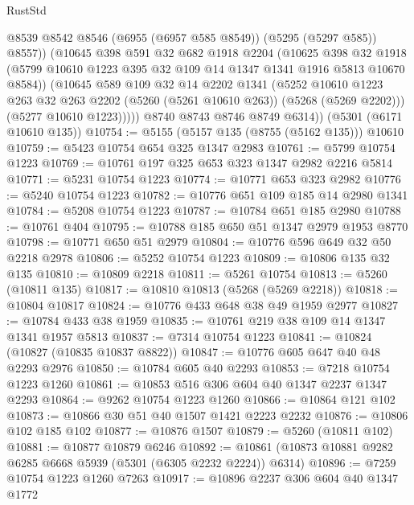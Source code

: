 \begin{lexlean}{RustStd}
\begin{coremodule}
                @8539
                @8542
                @8546
                (@6955 (@6957 @585 @8549))
                (@5295 (@5297 @585))
                @8557))
            (@10645
              @398
              @591
              @32
              @682
              @1918
              @2204
              (@10625
                @398
                @32
                @1918
                (@5799 @10610 @1223 @395 @32 @109 @14 @1347 @1341 @1916 @5813 @10670 @8584))
              (@10645
                @589
                @109
                @32
                @14
                @2202
                @1341
                (@5252
                  @10610
                  @1223
                  @263
                  @32
                  @263
                  @2202
                  (@5260 (@5261 @10610 @263))
                  (@5268 (@5269 @2202)))
                (@5277 @10610 @1223)))))
        @8740
        @8743
        @8746
        @8749
        @6314))
    (@5301 (@6171 @10610 @135))
@10754 := @5155 (@5157 @135 (@8755 (@5162 @135))) @10610
@10759 := @5423 @10754 @654 @325 @1347 @2983
@10761 := @5799 @10754 @1223
@10769 := @10761 @197 @325 @653 @323 @1347 @2982 @2216 @5814
@10771 := @5231 @10754 @1223
@10774 := @10771 @653 @323 @2982
@10776 := @5240 @10754 @1223
@10782 := @10776 @651 @109 @185 @14 @2980 @1341
@10784 := @5208 @10754 @1223
@10787 := @10784 @651 @185 @2980
@10788 := @10761 @404
@10795 := @10788 @185 @650 @51 @1347 @2979 @1953 @8770
@10798 := @10771 @650 @51 @2979
@10804 := @10776 @596 @649 @32 @50 @2218 @2978
@10806 := @5252 @10754 @1223
@10809 := @10806 @135 @32 @135
@10810 := @10809 @2218
@10811 := @5261 @10754
@10813 := @5260 (@10811 @135)
@10817 := @10810 @10813 (@5268 (@5269 @2218))
@10818 := @10804 @10817
@10824 := @10776 @433 @648 @38 @49 @1959 @2977
@10827 := @10784 @433 @38 @1959
@10835 := @10761 @219 @38 @109 @14 @1347 @1341 @1957 @5813
@10837 := @7314 @10754 @1223
@10841 := @10824 (@10827 (@10835 @10837 @8822))
@10847 := @10776 @605 @647 @40 @48 @2293 @2976
@10850 := @10784 @605 @40 @2293
@10853 := @7218 @10754 @1223 @1260
@10861 := @10853 @516 @306 @604 @40 @1347 @2237 @1347 @2293
@10864 := @9262 @10754 @1223 @1260
@10866 := @10864 @121 @102
@10873 := @10866 @30 @51 @40 @1507 @1421 @2223 @2232
@10876 := @10806 @102 @185 @102
@10877 := @10876 @1507
@10879 := @5260 (@10811 @102)
@10881 := @10877 @10879 @6246
@10892 := @10861 (@10873 @10881 @9282 @6285 @6668 @5939 (@5301 (@6305 @2232 @2224)) @6314)
@10896 := @7259 @10754 @1223 @1260 @7263
@10917 := @10896
    @2237
    @306
    @604
    @40
    @1347
    @1772

\end{coremodule}
\end{lexlean}
